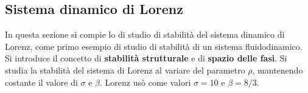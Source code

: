 \subsection{Sistema dinamico di Lorenz}
In questa sezione si compie lo di studio di stabilità del sistema dinamico di Lorenz,
 come primo esempio di studio di stabilità di un sistema fluidodinamico.
Si introduce il concetto di \textbf{stabilità strutturale} e di \textbf{spazio
 delle fasi}. Si studia la stabilità del sistema di Lorenz al variare del parametro
 $\rho$, mantenendo costante il valore di $\sigma$ e $\beta$.
Lorenz usò come valori $\sigma = 10$ e $\beta = 8/3$.

